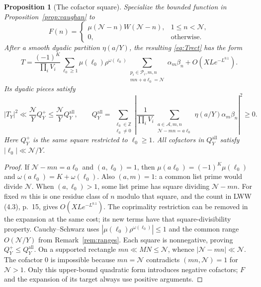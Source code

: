 \documentclass[11pt]{article}
\newtheorem{proposition}[theorem]{Proposition}
\theoremstyle{definition}
\newcommand{\Z}{\mathbb Z}
\newcommand{\GN}{\mathcal N}
\newcommand{\Aset}{\mathcal A}
\newcommand{\QQ}{Q_Y^{\mathrm{all}}}
\theoremstyle{remark}
\numberwithin{equation}{section}
\begin{document}
\begin{proposition}[The cofactor square]\label{prop:cofactor-square}
Specialize the bounded function in Proposition~\ref{prop:vaughan} to
\[
 F(n)=\begin{cases}
 \mu(\GN-n)W(\GN-n),&1\le n<\GN,\\
 0,&\text{otherwise}.
 \end{cases}
\]
After a smooth dyadic partition $\eta(a/Y)$, the resulting
\eqref{eq:Trect} has the form
\begin{equation}\label{eq:expansion-mu}
 T=\frac{(-1)^K}{\prod_i V_i}
 \sum_{\ell_0\ge1}\mu(\ell_0)\rho^{\omega(\ell_0)}
 \sum_{\substack{p_i\in\mathcal P_i,m,n\\mn+a\ell_0=\GN}}
 \alpha_m\beta_n+O(XLe^{-L^{0.1}}).
\end{equation}
Its dyadic pieces satisfy
\begin{equation}\label{eq:cauchy-all}
 |T_Y|^2\ll\frac{\GN}{Y}Q_Y^+\le\frac{\GN}{Y}\QQ,
 \qquad
 \QQ=\sum_{\substack{\ell_0\in\Z\\\ell_0\ne0}}
 \left|\frac1{\prod_i V_i}
 \sum_{\substack{a\in\Aset,m,n\\\GN-mn=a\ell_0}}
 \eta(a/Y)\alpha_m\beta_n\right|^2\ge0.
\end{equation}
Here $Q_Y^+$ is the same square restricted to $\ell_0\ge1$.
All cofactors in $\QQ$ satisfy $|\ell_0|\ll\GN/Y$.
\end{proposition}
\begin{proof}
If $\GN-mn=a\ell_0$ and $(a,\ell_0)=1$, then
$\mu(a\ell_0)=(-1)^K\mu(\ell_0)$ and $\omega(a\ell_0)=K+\omega(\ell_0)$.
Also $(a,m)=1$: a common list prime would divide $\GN$.
When $(a,\ell_0)>1$, some list prime has square dividing $\GN-mn$.
For fixed $m$ this is one residue class of $n$ modulo that square,
and the count in LWW (4.3), p.~15, gives $O(XLe^{-L^{0.1}})$.
The coprimality restriction can be removed in the expansion at the
same cost; its new terms have that square-divisibility property.
Cauchy--Schwarz uses $|\mu(\ell_0)\rho^{\omega(\ell_0)}|\le1$ and the
common range $O(\GN/Y)$ from Remark~\ref{rem:ranges}.
Each square is nonnegative, proving $Q_Y^+\le\QQ$.
On a supported rectangle $mn\ll MN\le\GN$, whence
$|\GN-mn|\ll\GN$. The cofactor $0$ is impossible because
$mn=\GN$ contradicts $(mn,\GN)=1$ for $\GN>1$.
Only this upper-bound quadratic form introduces negative cofactors;
$F$ and the expansion of its target always use positive arguments.
\end{proof}
\end{document}
